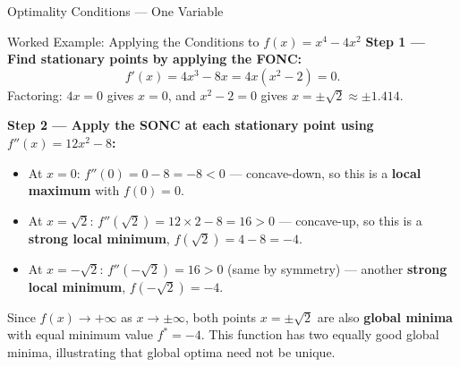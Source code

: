 \documentclass[aspectratio=169,10pt]{beamer}
\begin{document}
\begin{frame}[allowframebreaks]{Optimality Conditions --- One Variable}
\begin{exampleblock}{Worked Example: Applying the Conditions to $f(x) = x^4 - 4x^2$}
    \medskip
    \textbf{Step 1 --- Find stationary points by applying the FONC:}
    \[
      f'(x) = 4x^3 - 8x = 4x(x^2 - 2) = 0.
    \]
    Factoring: $4x = 0$ gives $x = 0$, and $x^2 - 2 = 0$ gives
    $x = \pm\sqrt{2} \approx \pm 1.414$.

    \medskip
    \textbf{Step 2 --- Apply the SONC at each stationary point using $f''(x) = 12x^2 - 8$:}
    \begin{itemize}
      \item At $x = 0$: $f''(0) = 0 - 8 = -8 < 0$ --- concave-down, so this
        is a \textbf{local maximum} with $f(0) = 0$.
      \item At $x = \sqrt{2}$: $f''(\sqrt{2}) = 12 \times 2 - 8 = 16 > 0$ ---
        concave-up, so this is a \textbf{strong local minimum},
        $f(\sqrt{2}) = 4 - 8 = -4$.
      \item At $x = -\sqrt{2}$: $f''(-\sqrt{2}) = 16 > 0$ (same by symmetry) ---
        another \textbf{strong local minimum}, $f(-\sqrt{2}) = -4$.
    \end{itemize}

    \medskip
    Since $f(x) \to +\infty$ as $x \to \pm\infty$, both points
    $x = \pm\sqrt{2}$ are also \textbf{global minima} with equal minimum value
    $f^* = -4$.  This function has two equally good global minima, illustrating
    that global optima need not be unique.
  \end{exampleblock}

\end{frame}
\end{document}
